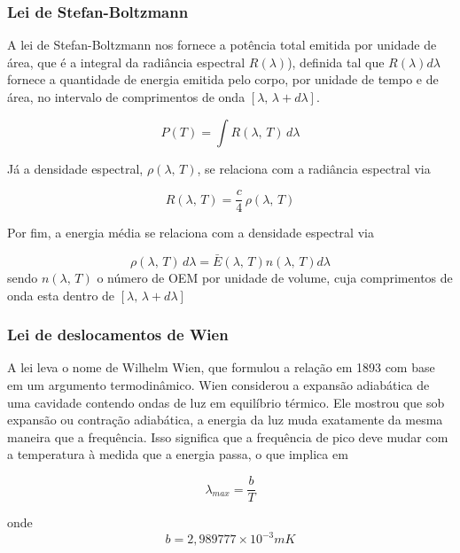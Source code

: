 \documentclass[12pt,brazil]{beamer}
\begin{document}

\begin{frame}
  \frametitle{Lei de Stefan-Boltzmann}
  
   \fontsize{10pt}{11pt}\selectfont
    A lei de Stefan-Boltzmann nos fornece a potência total emitida por unidade de área, que é a integral da radiância espectral $R(\lambda)$), definida tal que $R(\lambda) d\lambda$ fornece a quantidade de energia emitida pelo corpo, por unidade de tempo e de área, no intervalo de comprimentos de onda $[\lambda,\, \lambda + d\lambda]$. 
        
    \[
      P(T) = \int R(\lambda,\,T)\,d\lambda
    \]
    
    Já a densidade espectral, $\rho (\lambda, \, T)$, se relaciona com a radiância espectral via
    
    \[
      R(\lambda,\,T) = \dfrac{c}{4}\,\rho (\lambda, \, T)
    \]
    
    Por fim, a energia média se relaciona com a densidade espectral via
    
    \[
     \rho(\lambda , \, T) \, d\lambda = \bar{E}(\lambda , \, T)  n(\lambda , \, T) d\lambda
    \]
    sendo $n(\lambda , \, T)$ o número de OEM por unidade de volume, cuja comprimentos de onda esta dentro de $[\lambda,\, \lambda + d\lambda]$
    
    

\end{frame}





\begin{frame}
  \frametitle{Lei de deslocamentos de Wien}
  
        \fontsize{10pt}{11pt}\selectfont
        A lei leva o nome de Wilhelm Wien, que formulou a relação em 1893 com base em um argumento termodinâmico. Wien considerou a expansão adiabática de uma cavidade contendo ondas de luz em equilíbrio térmico. Ele mostrou que sob expansão ou contração adiabática, a energia da luz muda exatamente da mesma maneira que a frequência. Isso significa que a frequência de pico deve mudar com a temperatura à medida que a energia passa, o que implica em 
        
        \[
          \lambda_{max} = \dfrac{b}{T}
        \]
        
        onde
        \[
          b = 2,989777\times 10^{-3} m K
        \]

\end{frame}
\end{document}
